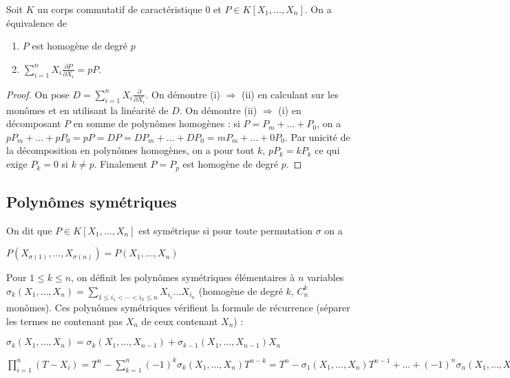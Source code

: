 \begin{thm}[Euler]
Soit $K$ un corps commutatif de caractéristique 0 et $P \in K[X_1,\ldots,X_n]$. On a équivalence de 
\begin{enumerate}
\item $P$ est homogène de degré $p$ 
\item $\sum_{i=1}^n X_i \frac{\partial P}{\partial X_i} = pP$.
\end{enumerate}
\end{thm}

\begin{proof}
On pose $D = \sum_{i=1}^n X_i \frac{\partial}{\partial X_i}$. On démontre (i) $\Rightarrow$ (ii) en calculant sur les monômes et en utilisant la linéarité de $D$. On démontre (ii) $\Rightarrow$ (i) en décomposant $P$ en somme de polynômes homogènes : si $P = P_m + \ldots + P_0$, on a $pP_m + \ldots + pP_0 = pP = DP = DP_m + \ldots + DP_0 = mP_m + \ldots + 0P_0$. Par unicité de la décomposition en polynômes homogènes, on a pour tout $k$, $pP_k = kP_k$ ce qui exige $P_k = 0$ si $k \neq p$. Finalement $P = P_p$ est homogène de degré $p$.
\end{proof}

\subsection{Polynômes symétriques}

\begin{de}
On dit que $P \in K[X_1,\ldots,X_n]$ est symétrique si pour toute permutation $\sigma$ on a

$P(X_{\sigma(1)},\ldots,X_{\sigma(n)}) = P(X_1,\ldots,X_n)$
\end{de}

\begin{ex}
Pour $1 \leq k \leq n$, on définit les polynômes symétriques élémentaires à $n$ variables $\sigma_k(X_1,\ldots,X_n) = \sum_{1\leq i_1<\cdots<i_k\leq n} X_{i_1}\ldots X_{i_n}$ (homogène de degré $k$, $C_n^k$ monômes). Ces polynômes symétriques vérifient la formule de récurrence (séparer les termes ne contenant pas $X_n$ de ceux contenant $X_n$) :

$\sigma_k(X_1,\ldots,X_n) = \sigma_k(X_1,\ldots,X_{n-1}) + \sigma_{k-1}(X_1,\ldots,X_{n-1})X_n$
\end{ex}

\begin{thm}
$\prod_{i=1}^n (T - X_i) = T^n - \sum_{k=1}^n (-1)^k \sigma_k(X_1,\ldots,X_n) T^{n-k} = T^n - \sigma_1(X_1,\ldots,X_n) T^{n-1} + \ldots + (-1)^n \sigma_n(X_1,\ldots,X_n)$
\end{thm}

